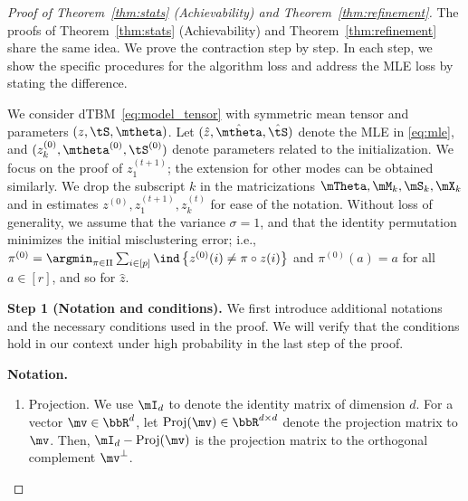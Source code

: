 \documentclass[lettersize,onecolumn,journal]{IEEEtran}
\theoremstyle{definition}
\theoremstyle{definition}
\newcommand{\offf}[1]{\left\{#1\right\}}
\begin{document}
\begin{proof}[Proof of Theorem~\ref{thm:stats} (Achievability) and Theorem~\ref{thm:refinement}]

{
\color{blue}

The proofs of Theorem~\ref{thm:stats} (Achievability) and Theorem~\ref{thm:refinement} share the same idea. We prove the contraction step by step. In each step, we show the specific procedures for the algorithm loss and address the MLE loss by stating the difference. 

We consider dTBM~\eqref{eq:model_tensor} with symmetric mean tensor and parameters $(z, \tS, \mtheta)$. Let $(\hat z, \hat \mtheta, \hat \tS)$ denote the MLE in \eqref{eq:mle}, and $(z^{(0)}_k, \mtheta^{(0)}, \tS^{(0)})$ denote parameters related to the initialization. We focus on the proof of $z^{(t+1)}_1$; the extension for other modes can be obtained similarly. We drop the subscript $k$ in the matricizations $\mTheta, \mM_k, \mS_k, \mX_k$ and in estimates $z^{(0)}, z^{(t+1)}_1, z^{(t)}_k$ for ease of the notation.  Without loss of generality, we assume that the variance $\sigma = 1$, and that the identity permutation minimizes the initial misclustering error; i.e., $\pi^{(0)} = \argmin_{\pi \in \Pi} \sum_{i \in [p]}\ind \offf{z^{(0)}(i) \neq \pi \circ z(i) }$ and $\pi^{(0)}(a) = a$ for all $ a \in [r]$, and so for $\hat z$. 
}



{\bf Step 1 (Notation and conditions).} We first introduce additional notations and the necessary conditions used in the proof. We will verify that the conditions hold in our context under high probability in the last step of the proof. 

{
\color{blue}

\textbf{Notation.}
\begin{enumerate}[wide]

\item Projection. We use $\mI_d$ to denote the identity matrix of dimension $d$. For a vector $\mv \in \bbR^d$, let $\text{Proj}(\mv) \in \bbR^{d \times d}$ denote the projection matrix to $\mv$. Then, $\mI_d - \text{Proj}(\mv)$ is the projection matrix to the orthogonal complement $\mv^{\perp}$. 


\end{enumerate}}
\end{proof}
\end{document}
